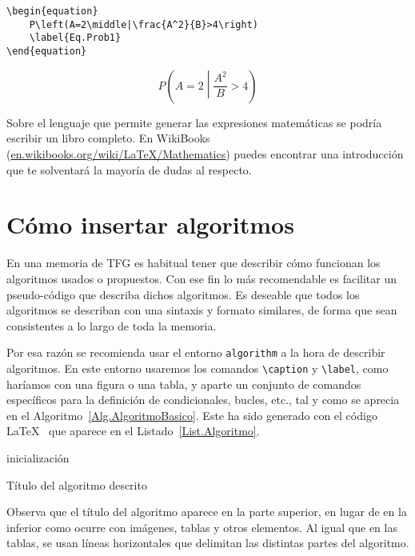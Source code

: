 \begin{lstlisting}[language={[LaTeX]TeX},caption={Definición de una ecuación},label=List.Ecuacion]
\begin{equation}
    P\left(A=2\middle|\frac{A^2}{B}>4\right)
    \label{Eq.Prob1}
\end{equation}
\end{lstlisting}

\begin{equation}
    P\left(A=2\middle|\frac{A^2}{B}>4\right)
    \label{Eq.Prob1}
\end{equation}

Sobre el lenguaje que permite generar las expresiones matemáticas se podría escribir un libro completo. En WikiBooks (\url{en.wikibooks.org/wiki/LaTeX/Mathematics}) puedes encontrar una introducción que te solventará la mayoría de dudas al respecto.

\section{Cómo insertar algoritmos}

En una memoria de TFG es habitual tener que describir cómo funcionan los algoritmos usados o propuestos. Con ese fin lo más recomendable es facilitar un pseudo-código que describa dichos algoritmos. Es deseable que todos los algoritmos se describan con una sintaxis y formato similares, de forma que sean consistentes a lo largo de toda la memoria.

Por esa razón se recomienda usar el entorno \verb|algorithm| a la hora de describir algoritmos. En este entorno usaremos los comandos \verb|\caption| y \verb|\label|, como haríamos con una figura o una tabla, y aparte un conjunto de comandos específicos para la definición de condicionales, bucles, etc., tal y como se aprecia en el Algoritmo~\ref{Alg.AlgoritmoBasico}. Este ha sido generado con el código \LaTeX~ que aparece en el Listado~\ref{List.Algoritmo}.

\begin{algorithm}[H]
\SetAlgoLined
{}
 inicialización\;
 \caption{Título del algoritmo descrito}
 \label{Alg.AlgoritmoBasico}
\end{algorithm}

Observa que el título del algoritmo aparece en la parte superior, en lugar de en la inferior como ocurre con imágenes, tablas y otros elementos. Al igual que en las tablas, se usan líneas horizontales que delimitan las distintas partes del algoritmo.

